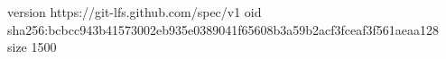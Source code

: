 version https://git-lfs.github.com/spec/v1
oid sha256:bcbcc943b41573002eb935e0389041f65608b3a59b2acf3fceaf3f561aeaa128
size 1500
